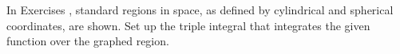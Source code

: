 {\noindent In Exercises} 
{,  standard regions in space, as defined by cylindrical and spherical coordinates, are shown. Set up the triple integral that integrates the given function over the graphed region.
}
